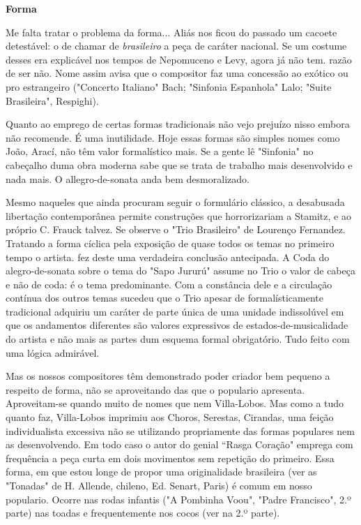 \textbf{Forma}

Me falta tratar o problema da forma... Aliás nos ficou do passado um
cacoete detestável: o de chamar de \emph{brasileiro} a peça de caráter
nacional. Se um costume desses era explicável nos tempos de Nepomuceno e
Levy, agora já não tem. razão de ser não. Nome assim avisa que o
compositor faz uma concessão ao exótico ou pro estrangeiro ("Concerto
Italiano" Bach; "Sinfonia Espanhola" Lalo; "Suite Brasileira",
Respighi).

Quanto ao emprego de certas formas tradicionais não vejo prejuízo nisso
embora não recomende. É uma inutilidade. Hoje essas formas são simples
nomes como João, Arací, não têm valor formalístico mais. Se a gente lê
"Sinfonia" no cabeçalho duma obra moderna sabe que se trata de trabalho
mais desenvolvido e nada mais. O allegro-de-sonata anda bem
desmoralizado.

Mesmo naqueles que ainda procuram seguir o formulário clássico, a
desabusada libertação contemporânea permite construções que
horrorizariam a Stamitz, e ao próprio C. Frauck talvez. Se observe o
"Trio Brasileiro" de Lourenço Fernandez. Tratando a forma cíclica pela
exposição de quase todos os temas no primeiro tempo o artista. fez deste
uma verdadeira conclusão antecipada. A Coda do alegro-de-sonata sobre o
tema do "Sapo Jururú" assume no Trio o valor de cabeça e não de coda: é
o tema predominante. Com a constância dele e a circulação contínua dos
outros temas sucedeu que o Trio apesar de formalísticamente tradicional
adquiriu um caráter de parte única de uma unidade indissolúvel em que os
andamentos diferentes são valores expressivos de estados-de-musicalidade
do artista e não mais as partes dum esquema formal obrigatório. Tudo
feito com uma lógica admirável.~

Mas os nossos compositores têm demonstrado poder criador bem pequeno a
respeito de forma, não se aproveitando das que o populario apresenta.
Aproveitam-se quando muito de nomes que nem Villa-Lobos. Mas como a tudo
quanto faz, Villa-Lobos imprimiu aos Choros, Serestas, Cirandas, uma
feição individualista excessiva não se utilizando propriamente das
formas populares nem as desenvolvendo. Em todo caso o autor do genial
``Rasga Coração" emprega com frequência a peça curta em dois movimentos
sem repetição do primeiro. Essa forma, em que estou longe de propor uma
originalidade brasileira (ver as "Tonadas" de H. Allende, chileno, Ed.
Senart, Paris) é comum em nosso populario. Ocorre nas rodas infantis ("A
Pombinha Voou", "Padre Francisco", 2.º parte) nas toadas e
frequentemente nos cocos (ver na 2.º parte).

